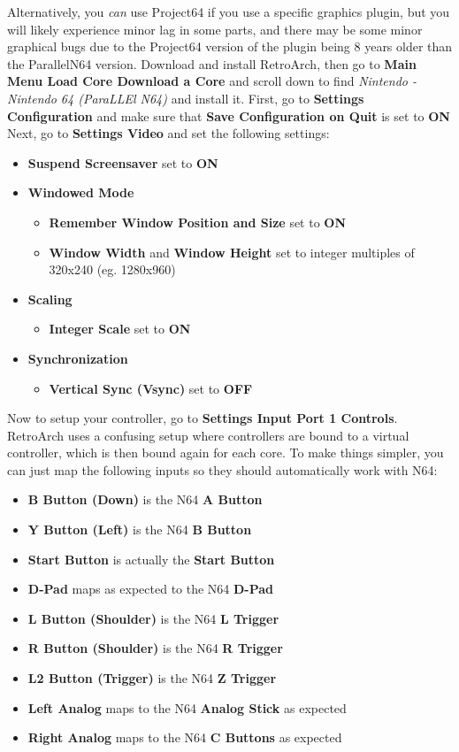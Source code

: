 \documentclass[11pt]{article}
\begin{document}
Alternatively, you \textit{can} use Project64 if you use a specific graphics plugin, but you will likely experience minor lag in some parts, and there may be some minor graphical bugs due to the Project64 version of the plugin being 8 years older than the ParallelN64 version.
\bigbreak
Download and install RetroArch, then go to \textbf{Main Menu \textrightarrow Load Core \textrightarrow Download a Core} and scroll down to find \textit{Nintendo - Nintendo 64 (ParaLLEl N64)} and install it.
\bigbreak
First, go to \textbf{Settings \textrightarrow Configuration} and make sure that \textbf{Save Configuration on Quit} is set to \textbf{ON}
\bigbreak
Next, go to \textbf{Settings \textrightarrow Video} and set the following settings:
\begin{itemize}
	\item \textbf{Suspend Screensaver} set to \textbf{ON}
	\item \textbf{Windowed Mode}
	\begin{itemize}
		\item \textbf{Remember Window Position and Size} set to \textbf{ON}
		\item \textbf{Window Width} and \textbf{Window Height} set to integer multiples of 320x240 (eg. 1280x960)
	\end{itemize}
	\item \textbf{Scaling}
	\begin{itemize}
		\item \textbf{Integer Scale} set to \textbf{ON}
	\end{itemize}
	\item \textbf{Synchronization}
	\begin{itemize}
		\item \textbf{Vertical Sync (Vsync)} set to \textbf{OFF}
	\end{itemize}
\end{itemize}
\bigbreak
Now to setup your controller, go to \textbf{Settings \textrightarrow Input \textrightarrow Port 1 Controls}. RetroArch uses a confusing setup where controllers are bound to a virtual controller, which is then bound again for each core. To make things simpler, you can just map the following inputs so they should automatically work with N64:
\begin{itemize}
	\item \textbf{B Button (Down)} is the N64 \textbf{A Button}
	\item \textbf{Y Button (Left)} is the N64 \textbf{B Button}
	\item \textbf{Start Button} is actually the \textbf{Start Button}
	\item \textbf{D-Pad} maps as expected to the N64 \textbf{D-Pad}
	\item \textbf{L Button (Shoulder)} is the N64 \textbf{L Trigger}
	\item \textbf{R Button (Shoulder)} is the N64 \textbf{R Trigger}
	\item \textbf{L2 Button (Trigger)} is the N64 \textbf{Z Trigger}
	\item \textbf{Left Analog} maps to the N64 \textbf{Analog Stick} as expected
	\item \textbf{Right Analog} maps to the N64 \textbf{C Buttons} as expected
\end{itemize}
\end{document}
